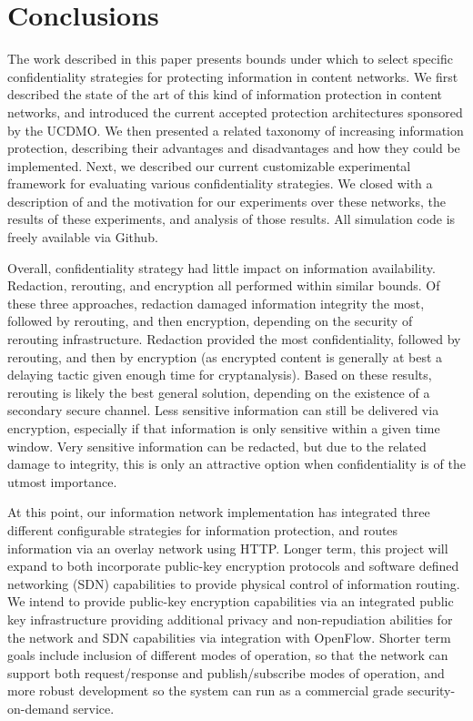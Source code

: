 \section{Conclusions}
The work described in this paper presents bounds under which to select specific confidentiality strategies for protecting information in content networks.  We first described the state of the art of this kind of information protection in content networks, and introduced the current accepted protection architectures sponsored by the UCDMO.  We then presented a related taxonomy of increasing information protection, describing their advantages and disadvantages and how they could be implemented.  Next, we described our current customizable experimental framework for evaluating various confidentiality strategies.  We closed with a description of and the motivation for our experiments over these networks, the results of these experiments, and analysis of those results.  All simulation code is freely available via Github.

	Overall, confidentiality strategy had little impact on information availability.  Redaction, rerouting, and encryption all performed within similar bounds.  Of these three approaches, redaction damaged information integrity the most, followed by rerouting, and then encryption, depending on the security of rerouting infrastructure.  Redaction provided the most confidentiality, followed by rerouting, and then by encryption (as encrypted content is generally at best a delaying tactic given enough time for cryptanalysis).  Based on these results, rerouting is likely the best general solution, depending on the existence of a secondary secure channel.  Less sensitive information can still be delivered via encryption, especially if that information is only sensitive within a given time window.  Very sensitive information can be redacted, but due to the related damage to integrity, this is only an attractive option when confidentiality is of the utmost importance.
	
	At this point, our information network implementation has integrated three different configurable strategies for information protection, and routes information via an overlay network using HTTP.  Longer term, this project will expand to both incorporate public-key encryption protocols and software defined networking (SDN) capabilities to provide physical control of information routing.  We intend to provide public-key encryption capabilities via an integrated public key infrastructure providing additional privacy and non-repudiation abilities for the network and SDN capabilities via integration with OpenFlow.  Shorter term goals include inclusion of different modes of operation, so that the network can support both request/response and publish/subscribe modes of operation, and more robust development so the system can run as a commercial grade security-on-demand service.
